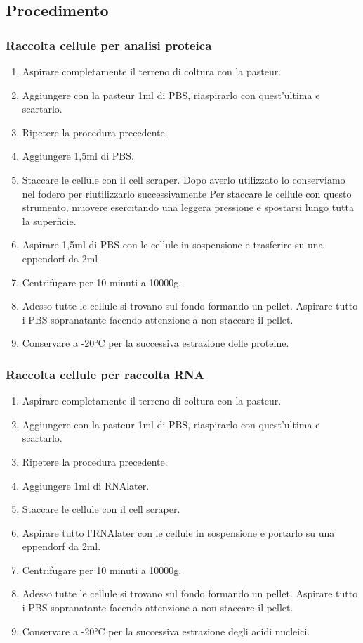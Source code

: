 \subsection{Procedimento}

\subsubsection{Raccolta cellule per analisi proteica}

\begin{enumerate}

\item Aspirare completamente il terreno di coltura con la pasteur.
\item Aggiungere con la pasteur 1ml di PBS, riaspirarlo con quest'ultima e scartarlo.
\item Ripetere la procedura precedente.
\item Aggiungere 1,5ml di PBS.
\item Staccare le cellule con il cell scraper.
Dopo averlo utilizzato lo conserviamo nel fodero per riutilizzarlo successivamente
Per staccare le cellule con questo strumento, muovere esercitando una leggera pressione
e spostarsi lungo tutta la superficie.
\item Aspirare 1,5ml di PBS con le cellule in sospensione e trasferire su una eppendorf da 2ml
\item Centrifugare per 10 minuti a 10000g.
\item Adesso tutte le cellule si trovano sul fondo formando un pellet. Aspirare tutto
i PBS sopranatante facendo attenzione a non staccare il pellet.
\item Conservare a -20°C per la successiva estrazione delle proteine.

\end{enumerate}

\subsubsection{Raccolta cellule per raccolta RNA}

\begin{enumerate}
    \item Aspirare completamente il terreno di coltura con la pasteur.
    \item Aggiungere con la pasteur 1ml di PBS, riaspirarlo con quest'ultima e scartarlo.
    \item Ripetere la procedura precedente.
    \item Aggiungere 1ml di RNAlater.
    \item Staccare le cellule con il cell scraper.
    \item Aspirare tutto l'RNAlater con le cellule in sospensione e portarlo su una
    eppendorf da 2ml.
    \item Centrifugare per 10 minuti a 10000g.
    \item Adesso tutte le cellule si trovano sul fondo formando un pellet. Aspirare tutto
    i PBS sopranatante facendo attenzione a non staccare il pellet.
    \item Conservare a -20°C per la successiva estrazione degli acidi nucleici.
\end{enumerate}

